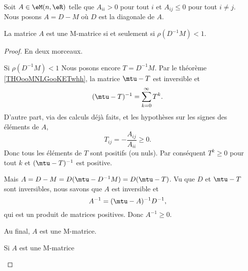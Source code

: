 \begin{proposition}     \label{PROPooWVHXooCfsvGq}
    Soit \( A\in \eM(n,\eR)\) telle que \( A_{ii}>0\) pour tout \( i\) et \( A_{ij}\leq 0\) pour tout \( i\neq j\). Nous posons \( A=D-M\) où \( D\) est la diagonale de \( A\). 

    La matrice \( A\) est une M-matrice si et seulement si \( \rho(D^{-1}M)<1\).
\end{proposition}

\begin{proof}
    En deux morceaux.
    \begin{subproof}
        \item[Si \( \rho(D^{-1}M)<1\)]
            Nous posons encore \( T=D^{-1}M\). Par le théorème \ref{THOooMNLGooKETwhh}, la matrice \( \mtu-T\) est inversible et
            \begin{equation}
                (\mtu-T)^{-1}=\sum_{k=0}^{\infty}T^k.
            \end{equation}
            D'autre part, via des calculs déjà faits, et les hypothèses sur les signes des éléments de \( A\),
            \begin{equation}
                T_{ij}=-\frac{ A_{ij} }{ A_{ii} }\geq 0.
            \end{equation}
            Donc tous les éléments de \( T\) sont positifs (ou nuls). Par conséquent \( T^k\geq 0\) pour tout \( k\) et \( (\mtu-T)^{-1}\) est positive.

            Mais \( A=D-M=D(\mtu-D^{-1}M)=D(\mtu-T)\). Vu que \( D\) et \( \mtu-T\) sont inversibles, nous savons que \( A\) est inversible et
            \begin{equation}
                A^{-1}=(\mtu-A)^{-1}D^{-1},
            \end{equation}
            qui est un produit de matrices positives. Donc \( A^{-1}\geq 0\).

            Au final, \( A\) est une M-matrice.

        \item[Si \( A\) est une M-matrice]



\end{subproof}
\end{proof}
